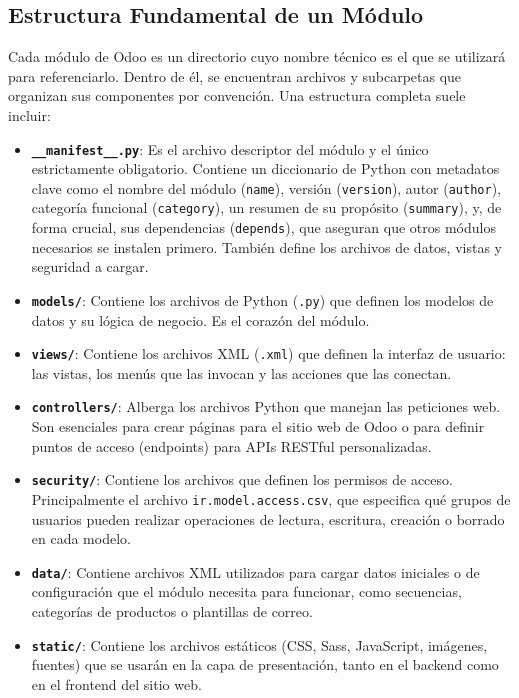 \documentclass[12pt,letterpaper,spanish]{report}
\begin{document}
\subsection{Estructura Fundamental de un Módulo}
\label{sub:estructura_modulo}
Cada módulo de Odoo es un directorio cuyo nombre técnico es el que se utilizará para referenciarlo. Dentro de él, se encuentran archivos y subcarpetas que organizan sus componentes por convención. Una estructura completa suele incluir:
\begin{itemize}
    \item \textbf{\texttt{\_\_manifest\_\_.py}}: Es el archivo descriptor del módulo y el único estrictamente obligatorio. Contiene un diccionario de Python con metadatos clave como el nombre del módulo (\texttt{name}), versión (\texttt{version}), autor (\texttt{author}), categoría funcional (\texttt{category}), un resumen de su propósito (\texttt{summary}), y, de forma crucial, sus dependencias (\texttt{depends}), que aseguran que otros módulos necesarios se instalen primero. También define los archivos de datos, vistas y seguridad a cargar.

    \item \textbf{\texttt{models/}}: Contiene los archivos de Python (\texttt{.py}) que definen los modelos de datos y su lógica de negocio. Es el corazón del módulo.

    \item \textbf{\texttt{views/}}: Contiene los archivos XML (\texttt{.xml}) que definen la interfaz de usuario: las vistas, los menús que las invocan y las acciones que las conectan.

    \item \textbf{\texttt{controllers/}}: Alberga los archivos Python que manejan las peticiones web. Son esenciales para crear páginas para el sitio web de Odoo o para definir puntos de acceso (endpoints) para APIs RESTful personalizadas.

    \item \textbf{\texttt{security/}}: Contiene los archivos que definen los permisos de acceso. Principalmente el archivo \texttt{ir.model.access.csv}, que especifica qué grupos de usuarios pueden realizar operaciones de lectura, escritura, creación o borrado en cada modelo.

    \item \textbf{\texttt{data/}}: Contiene archivos XML utilizados para cargar datos iniciales o de configuración que el módulo necesita para funcionar, como secuencias, categorías de productos o plantillas de correo.

    \item \textbf{\texttt{static/}}: Contiene los archivos estáticos (CSS, Sass, JavaScript, imágenes, fuentes) que se usarán en la capa de presentación, tanto en el backend como en el frontend del sitio web.
\end{itemize}
\end{document}
